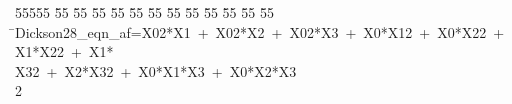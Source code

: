 %
%
\begin{tabbing}
55555 \= 55 \= 55 \= 55 \= 55 \= 55 \= 55 \= 55 \= 55 \= 55 \= 55 \= 55 \= 55 \= \>Dickson28\_eqn\_af=X02*X1\ +\ X02*X2\ +\ X02*X3\ +\ X0*X12\ +\ X0*X22\ +\ X1*X22\ +\ X1*\\[0pt]
\>X32\ +\ X2*X32\ +\ X0*X1*X3\ +\ X0*X2*X3\\[0pt]
2\>\end{tabbing}
